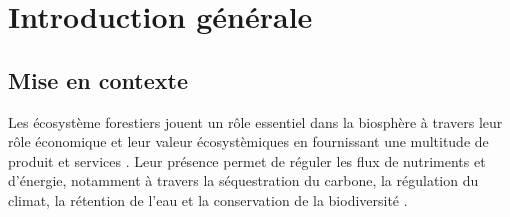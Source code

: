 \chapter*{Introduction générale}         %
\label{chap-introduction}       %


\section*{Mise en contexte}
\label{sec:contexte}


Les écosystème forestiers jouent un rôle essentiel dans la biosphère à travers leur rôle économique et leur valeur écosystèmiques en fournissant une multitude de produit et services \citep{Balvanera2006Quantifyingevidence}. 
Leur présence permet de réguler les flux de nutriments et d'énergie, notamment à travers la séquestration du carbone, la régulation du climat, la rétention de l'eau et la conservation de la biodiversité \citep{Balvanera2006Quantifyingevidence,Diaz2006BiodiversityLoss,Canadell2008Managingforests,Pawson2013Plantationforests}. 


